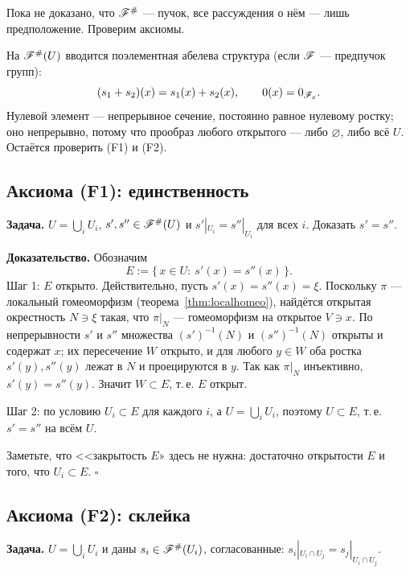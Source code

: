 \label{sec:axioms}

Пока не доказано, что $\mathscr{F}^{\#}$ --- пучок, все рассуждения о нём
--- лишь предположение. Проверим аксиомы.

\begin{rem}
На $\mathscr{F}^{\#}(U)$ вводится поэлементная абелева структура (если
$\mathscr{F}$ --- предпучок групп):
\[
 (s_1+s_2)(x)=s_1(x)+s_2(x),\qquad
 0(x)=0_{\mathscr{F}_x}.
\]
Нулевой элемент --- непрерывное сечение, постоянно равное нулевому
ростку; оно непрерывно, потому что прообраз любого открытого ---
либо $\varnothing$, либо всё $U$. Остаётся проверить (F1) и (F2).
\end{rem}

\subsection{Аксиома (F1): единственность}
\textbf{Задача.} $U=\bigcup_i U_i$, $s',s''\in\mathscr{F}^{\#}(U)$ и
$s'|_{U_i}=s''|_{U_i}$ для всех $i$. Доказать $s'=s''$.

\textbf{Доказательство.} Обозначим
\[
 E:=\{\,x\in U:\ s'(x)=s''(x)\,\}.
\]
Шаг 1: $E$ открыто. Действительно, пусть $s'(x)=s''(x)=\xi$. Поскольку
$\pi$ --- локальный гомеоморфизм (теорема~\ref{thm:localhomeo}), найдётся
открытая окрестность $N\ni\xi$ такая, что $\pi|_{N}$ --- гомеоморфизм
на открытое $V\ni x$. По непрерывности $s'$ и $s''$ множества
$(s')^{-1}(N)$ и $(s'')^{-1}(N)$ открыты и содержат $x$; их пересечение
$W$ открыто, и для любого $y\in W$ оба ростка $s'(y),s''(y)$ лежат в
$N$ и проецируются в $y$. Так как $\pi|_N$ инъективно,
$s'(y)=s''(y)$. Значит $W\subset E$, т.\,е. $E$ открыт.

Шаг 2: по условию $U_i\subset E$ для каждого $i$, а $U=\bigcup_iU_i$,
поэтому $U\subset E$, т.\,е. $s'=s''$ на всём $U$.

Заметьте, что <<закрытость $E$» здесь не нужна: достаточно открытости
$E$ и того, что $U_i\subset E$.
\hfill$\square$

\subsection{Аксиома (F2): склейка}
\textbf{Задача.} $U=\bigcup_iU_i$ и даны
$s_i\in\mathscr{F}^{\#}(U_i)$, согласованные:
$s_i|_{U_i\cap U_j}=s_j|_{U_i\cap U_j}$.

